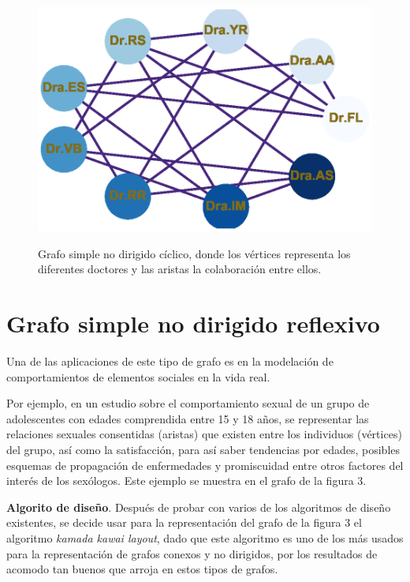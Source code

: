 \documentclass{article}
\begin{document}
    
\begin{center}

\end{center}
\begin{figure}[ht]
\begin{center}
\includegraphics[scale=0.7]{Graf2_circular_layout.eps}\\
\caption{Grafo simple no dirigido cíclico, donde los vértices representa los diferentes doctores y las aristas la colaboración entre ellos.}
\end{center}

\end{figure}

\newpage
\section{Grafo simple no dirigido reflexivo}
Una de las aplicaciones de este tipo de grafo es en la modelación de comportamientos de elementos sociales en la vida real.\linebreak

Por ejemplo, en un estudio sobre el comportamiento sexual de un grupo de adolescentes con edades comprendida entre 15 y 18 años, se representar las relaciones sexuales consentidas (aristas) que existen entre los individuos (vértices) del grupo, así como la satisfacción, para así saber tendencias por edades, posibles esquemas de propagación de enfermedades y promiscuidad entre otros factores del interés de los sexólogos. Este ejemplo se muestra en el grafo de la figura 3.\linebreak

\textbf{Algorito de diseño}.\linebreak
Después de probar con varios de los algoritmos de diseño existentes, se decide usar para la representación del grafo de la figura 3 el algoritmo \textit{kamada kawai layout}, dado que este algoritmo es uno de los más usados para la representación de grafos conexos y no dirigidos, por los resultados de acomodo tan buenos que arroja en estos tipos de grafos.
\end{document}
